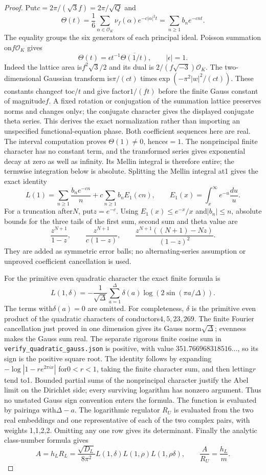 \begin{proof}
Put$c=2\pi/(\sqrt3 f)=2\pi/\sqrt Q$ and
\[
 \Theta(t)=\frac16\sum_{\alpha\in\mathcal O_K}
               \nu_f(\alpha)e^{-c|\alpha|^2t}
          =\sum_{n\ge1}b_ne^{-cnt}.
\]
The equality groups the six generators of each principal ideal.
Poisson summation on$f\mathcal O_K$ gives
\[
              \Theta(t)=\epsilon t^{-1}\overline{\Theta(1/t)},
                         \qquad |\epsilon|=1.
\]
Indeed the lattice area is$f^2\sqrt3/2$ and its dual is
$2/(f\sqrt{-3})\mathcal O_K$.  The two-dimensional Gaussian transform
is$\pi/(ct)$ times$\exp(-\pi^2|w|^2/(ct))$.
These constants change$ct$ to$c/t$ and give factor$1/(ft)$ before
the finite Gauss constant of magnitude$f$.
A fixed rotation or conjugation of the summation lattice preserves norms
and changes only$\epsilon$; the conjugate character gives the displayed
conjugate theta series.  This derives the exact normalization rather than
importing an unspecified functional-equation phase.
Both coefficient sequences here are real.
The interval computation proves $\Theta(1)\ne0$, hence$\epsilon=1$.
The nonprincipal finite character has no constant term, and the transformed
series gives exponential decay at zero as well as infinity.  Its Mellin
integral is therefore entire; the termwise integration below is absolute.
Splitting the Mellin integral at1 gives the exact identity
\[
 L(1)=\sum_{n\ge1}\frac{b_ne^{-cn}}n
       +c\sum_{n\ge1}b_n E_1(cn),
 \qquad E_1(x)=\int_x^\infty e^{-u}\frac{du}{u}.
\]
For a truncation after$N$, put$z=e^{-c}$.
Using $E_1(x)\le e^{-x}/x$ and$|b_n|\le n$, absolute bounds for the
three tails of the first sum, second sum and theta value are
\[
 \frac{z^{N+1}}{1-z},\qquad
 \frac{z^{N+1}}{c(1-z)},\qquad
 \frac{z^{N+1}((N+1)-Nz)}{(1-z)^2}.
\]
They are added as symmetric error balls; no alternating-series assumption
or unproved coefficient cancellation is used.

For the primitive even quadratic character the exact finite formula is
\[
 L(1,\delta)=-\frac1{\sqrt\Delta}
       \sum_{a=1}^{\Delta}\delta(a)
                    \log(2\sin(\pi a/\Delta)).
\]
The terms with$\delta(a)=0$ are omitted.  For completeness, $\delta$ is the primitive even product of the
quadratic characters of conductors$4,5,23,269$.
The finite Fourier cancellation just proved in one dimension gives its
Gauss norm$\sqrt\Delta$; evenness makes the Gauss sum real.
The separate rigorous finite cosine sum in
\texttt{verify\_quadratic\_gauss.json} is positive, with value
$351.766968318516\ldots$, so its sign is the positive square root.
The identity follows by expanding
$-\log|1-re^{2\pi ix}|$ for$0<r<1$, taking the finite character sum,
and then letting$r$ tend to1.  Bounded partial sums of the nonprincipal
character justify the Abel limit on the Dirichlet side; every surviving
logarithm has nonzero argument.  Thus no unstated Gauss sign convention
enters the formula.
The function is evaluated by pairing$a$ with$\Delta-a$.
The logarithmic regulator $R_U$ is evaluated from the two real embeddings
and one representative of each of the two complex pairs, with weights
1,1,2,2.  Omitting any one row gives its determinant.
Finally the analytic class-number formula gives
\[
 A=h_LR_L=\frac{\sqrt{D_L}}{8\pi^2}
               L(1,\delta)L(1,\rho)L(1,\rho\delta),
 \qquad \frac A{R_U}=\frac{h_L}{m}.
\]


\end{proof}

